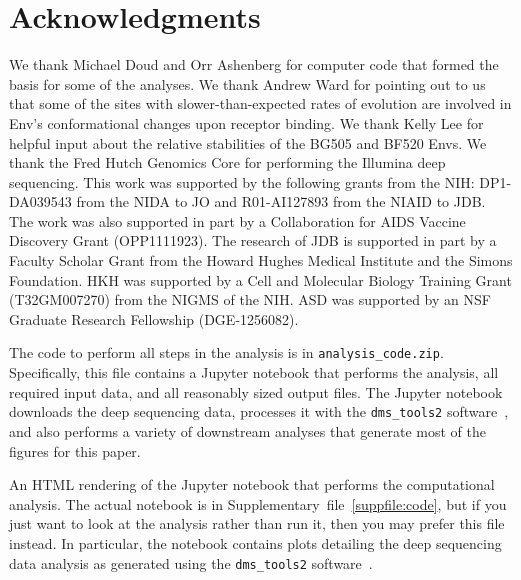 \documentclass[9pt]{elife}
\begin{document}
\section{Acknowledgments}
We thank Michael Doud and Orr Ashenberg for computer code that formed the basis for some of the analyses.
We thank Andrew Ward for pointing out to us that some of the sites with slower-than-expected rates of evolution are involved in Env's conformational changes upon receptor binding.
We thank Kelly Lee for helpful input about the relative stabilities of the BG505 and BF520 Envs.
We thank the Fred Hutch Genomics Core for performing the Illumina deep sequencing.
This work was supported by the following grants from the NIH: DP1-DA039543 from the NIDA to JO and R01-AI127893 from the NIAID to JDB.
The work was also supported in part by a Collaboration for AIDS Vaccine Discovery Grant (OPP1111923).
The research of JDB is supported in part by a Faculty Scholar Grant from the Howard Hughes Medical Institute and the Simons Foundation.
HKH was supported by a Cell and Molecular Biology Training Grant (T32GM007270) from the NIGMS of the NIH.
ASD was supported by an NSF Graduate Research Fellowship (DGE-1256082).



\clearpage

\begin{suppfile}
\caption{
\label{suppfile:code}
The code to perform all steps in the analysis is in \texttt{analysis\_code.zip}.
Specifically, this file contains a Jupyter notebook that performs the analysis, all required input data, and all reasonably sized output files.
The Jupyter notebook downloads the deep sequencing data, processes it with the \texttt{dms\_tools2} software~\citep[\url{https://jbloomlab.github.io/dms_tools2/}]{bloom2015software}, and also performs a variety of downstream analyses that generate most of the figures for this paper.
}
\end{suppfile}

\begin{suppfile}
\caption{
\label{suppfile:html}
An HTML rendering of the Jupyter notebook that performs the computational analysis.
The actual notebook is in Supplementary~file~\ref{suppfile:code}, but if you just want to look at the analysis rather than run it, then you may prefer this file instead.
In particular, the notebook contains plots detailing the deep sequencing data analysis as generated using the \texttt{dms\_tools2} software~\citep[\url{https://jbloomlab.github.io/dms_tools2/}]{bloom2015software}.
}
\end{suppfile}
\end{document}
